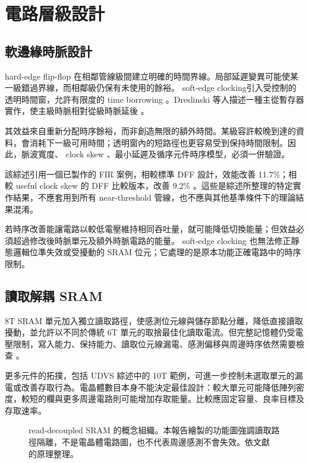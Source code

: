 \chapter{電路層級設計}
\label{ch:circuit}
\section{軟邊緣時脈設計}
 hard-edge flip-flop 在相鄰管線級間建立明確的時間界線。局部延遲變異可能使某一級錯過界線，而相鄰級仍保有未使用的餘裕。 soft-edge clocking引入受控制的透明時間窗，允許有限度的 time borrowing 。Dreslinski 等人描述一種主從暫存器實作，使主級時脈相對從級時脈延後 \cite[Sec.~V-B]{dreslinski2010}。

其效益來自重新分配時序餘裕，而非創造無限的額外時間。某級容許較晚到達的資料，會消耗下一級可用時間；透明窗內的短路徑也更容易受到保持時間限制。因此，脈波寬度、 clock skew 、最小延遲及循序元件時序模型，必須一併驗證。

該綜述引用一個已製作的 FIR 案例，相較標準 DFF 設計，效能改善 11.7\%；相較 useful clock skew 的 DFF 比較版本，改善 9.2\% \cite{dreslinski2010}。這些是綜述所整理的特定實作結果，不應套用到所有 near-threshold 管線，也不應與其他基準條件下的理論結果混淆。

若時序改善能讓電路以較低電壓維持相同吞吐量，就可能降低切換能量；但效益必須超過修改後時脈單元及額外時脈電路的能量。 soft-edge clocking 也無法修正靜態邏輯位準失效或受擾動的 SRAM 位元；它處理的是原本功能正確電路中的時序限制。

\section{讀取解耦 SRAM}
8T SRAM 單元加入獨立讀取路徑，使感測位元線與儲存節點分離，降低直接讀取擾動，並允許以不同於傳統 6T 單元的取捨最佳化讀取電流。但完整記憶體仍受電壓限制，寫入能力、保持能力、讀取位元線漏電、感測偏移與周邊時序依然需要檢查 \cite[Sec.~III]{udvs2010}。

更多元件的拓撲，包括 UDVS 綜述中的 10T 範例，可進一步控制未選取單元的漏電或改善存取行為。電晶體數目本身不能決定最佳設計：較大單元可能降低陣列密度，較短的欄與更多周邊電路則可能增加存取能量。比較應固定容量、良率目標及存取速率。

\begin{figure}[htbp]
\centering
{}
\caption{ read-decoupled SRAM 的概念組織。本報告繪製的功能圖強調讀取路徑隔離，不是電晶體電路圖，也不代表周邊感測不會失效。依文獻 \cite{udvs2010} 的原理整理。}
\end{figure}

